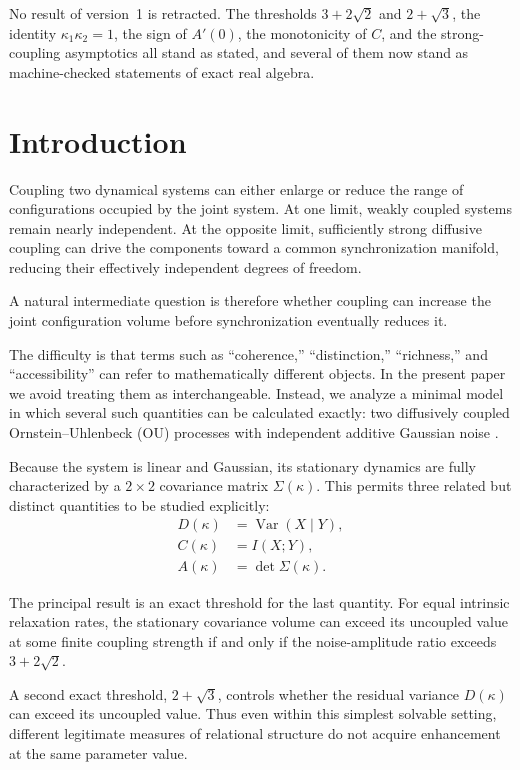 \documentclass[11pt]{article}
\theoremstyle{plain}
\theoremstyle{remark}
\newcommand{\Var}{\operatorname{Var}}
\newcommand{\I}{I}
\begin{document}
No result of version~1 is retracted. The thresholds $3+2\sqrt2$ and $2+\sqrt3$, the identity
$\kappa_1\kappa_2=1$, the sign of $A'(0)$, the monotonicity of $C$, and the strong-coupling
asymptotics all stand as stated, and several of them now stand as machine-checked statements
of exact real algebra.

\section{Introduction}

Coupling two dynamical systems can either enlarge or reduce the range of configurations
occupied by the joint system. At one limit, weakly coupled systems remain nearly independent.
At the opposite limit, sufficiently strong diffusive coupling can drive the components toward a
common synchronization manifold, reducing their effectively independent degrees of freedom.

A natural intermediate question is therefore whether coupling can increase the joint
configuration volume before synchronization eventually reduces it.

The difficulty is that terms such as ``coherence,'' ``distinction,'' ``richness,'' and
``accessibility'' can refer to mathematically different objects. In the present paper we avoid
treating them as interchangeable. Instead, we analyze a minimal model in which several such
quantities can be calculated exactly: two diffusively coupled Ornstein--Uhlenbeck (OU)
processes with independent additive Gaussian noise \cite{UhlenbeckOrnstein1930,Gardiner2004}.

Because the system is linear and Gaussian, its stationary dynamics are fully characterized by a
$2\times2$ covariance matrix $\Sigma(\kappa)$. This permits three related but distinct
quantities to be studied explicitly:
\begin{align}
  D(\kappa) &= \Var(X\mid Y), \label{eq:D}\\
  C(\kappa) &= \I(X;Y), \label{eq:C}\\
  A(\kappa) &= \det\Sigma(\kappa). \label{eq:A}
\end{align}

The principal result is an exact threshold for the last quantity. For equal intrinsic
relaxation rates, the stationary covariance volume can exceed its uncoupled value at some
finite coupling strength if and only if the noise-amplitude ratio exceeds $3+2\sqrt2$.

A second exact threshold, $2+\sqrt3$, controls whether the residual variance $D(\kappa)$ can
exceed its uncoupled value. Thus even within this simplest solvable setting, different
legitimate measures of relational structure do not acquire enhancement at the same parameter
value.
\end{document}
